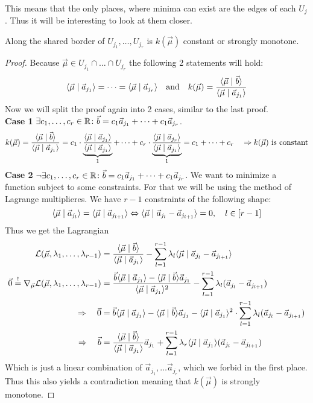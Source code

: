 This means that the only places, where minima can exist are the edges of each $U_j$. Thus it will be interesting to look at them closer.

\begin{lemma}
    Along the shared border of $U_{j_1}, \dots, U_{j_r}$ is $k(\vec\mu)$ constant or strongly monotone.
\end{lemma}
\begin{proof}
    Because $\vec \mu \in U_{j_1}\cap \dots\cap U_{j_r}$ the following 2 statements will hold:
    $$\langle \vec{\mu} \mid \vec a_{j_1} \rangle = \dots = \langle \vec{\mu} \mid \vec a_{j_r} \rangle \quad\textrm{and}\quad k(\vec\mu) = \frac{\langle \vec \mu \mid \vec b \rangle}{\langle \vec \mu \mid \vec a_{j_1} \rangle}$$
    Now we will split the proof again into 2 cases, similar to the last proof.\\
    \textbf{Case 1} $\exists c_1, \dots, c_r \in \mathbb{R}\colon \vec b = c_1\vec a_{j_1} + \dots + c_1\vec a_{j_r}$.
    $$k(\vec\mu) = \frac{\langle \vec \mu \mid \vec b \rangle}{\langle \vec \mu \mid \vec a_{j_1} \rangle} = c_1 \cdot \underbrace{\frac{\langle \vec \mu \mid \vec a_{j_1} \rangle}{\langle \vec \mu \mid \vec a_{j_1} \rangle}}_1 + \dots + c_r \cdot \underbrace{\frac{\langle \vec \mu \mid \vec a_{j_r} \rangle}{\langle \vec \mu \mid \vec a_{j_1} \rangle}}_1 = c_1 + \dots + c_r \quad \Rightarrow k(\vec\mu)\textrm{ is constant}$$
    \textbf{Case 2} $\lnot\exists c_1, \dots, c_r \in \mathbb{R}\colon \vec b = c_1\vec a_{j_1} + \dots + c_1\vec a_{j_r}$. We want to minimize a function subject to some constraints. For that we will be using the method of Lagrange multiplieres. We have $r-1$ constraints of the following shape:
    $$\langle \vec\mu \mid \vec a_{j_l} \rangle = \langle \vec\mu \mid \vec a_{j_{l+1}} \rangle \Leftrightarrow \langle \vec\mu \mid \vec a_{j_l} - \vec a_{j_{l+1}} \rangle = 0, \quad l \in [r-1]$$
    Thus we get the Lagrangian
    \begin{align*}
        \mathcal{L}(\vec\mu, \lambda_1, \dots, \lambda_{r-1}) &= \frac{\langle \vec \mu \mid \vec b \rangle}{\langle \vec \mu \mid \vec a_{j_1} \rangle} - \sum_{l=1}^{r-1}\lambda_l \langle \vec\mu \mid \vec a_{j_l} - \vec a_{j_{l+1}} \rangle\\
        \vec0 \stackrel{!}{=}\nabla_{\vec \mu} \mathcal{L}(\vec\mu, \lambda_1, \dots, \lambda_{r-1}) &= \frac{\vec b\langle \vec\mu \mid \vec a_{j_{1}} \rangle - \langle \vec\mu \mid \vec b \rangle\vec a_{j_{1}}}{\langle \vec\mu \mid \vec a_{j_{1}} \rangle^2} - \sum_{l=1}^{r-1}\lambda_l(\vec a_{j_l} - \vec a_{j_{l+1}}) \\
        \Rightarrow\quad \vec0 &= \vec b\langle \vec\mu \mid \vec a_{j_{1}} \rangle - \langle \vec\mu \mid \vec b \rangle\vec a_{j_{1}} - \langle \vec\mu \mid \vec a_{j_{1}} \rangle^2\cdot\sum_{l=1}^{r-1}\lambda_l(\vec a_{j_l} - \vec a_{j_{l+1}})\\
        \Rightarrow\quad \vec b &= \frac{\langle \vec \mu \mid \vec b \rangle}{\langle \vec \mu \mid \vec a_{j_{1}} \rangle}\vec a_{j_{1}} + \sum_{l=1}^{r-1} \lambda_r \langle \vec\mu \mid \vec a_{j_{1}} \rangle(\vec a_{j_l} - \vec a_{j_{l+1}})
    \end{align*}
    Which is just a linear combination of $\vec a_{j_1}, \dots \vec a_{j_r}$, which we forbid in the first place. Thus this also yields a contradiction meaning that $k(\vec\mu)$ is strongly monotone.
\end{proof}

